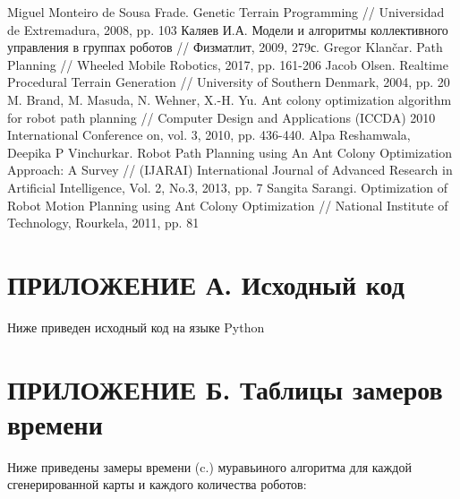 \documentclass{article}
\numberwithin{equation}{section}
\begin{document}
    \newpage
	\renewcommand\refname{ЛИТЕРАТУРА}
	\begin{thebibliography}{}
		 Miguel Monteiro de Sousa Frade. Genetic Terrain Programming // Universidad de Extremadura, 2008, pp. 103
		 Каляев И.А. Модели и алгоритмы коллективного управления в группах роботов // Физматлит, 2009, 279с.
		 Gregor Klančar. Path Planning // Wheeled Mobile Robotics, 2017, pp. 161-206
		 Jacob Olsen. Realtime Procedural Terrain Generation // University of Southern Denmark, 2004, pp. 20
		 M. Brand, M. Masuda, N. Wehner, X.-H. Yu. Ant colony optimization algorithm for robot path planning // Computer Design and Applications (ICCDA) 2010 International Conference on, vol. 3, 2010, pp. 436-440.
		 Alpa Reshamwala, Deepika P Vinchurkar. Robot Path Planning using An Ant Colony Optimization Approach: A Survey // (IJARAI) International Journal of Advanced Research in Artificial Intelligence, Vol. 2, No.3, 2013, pp. 7
		 Sangita Sarangi. Optimization of Robot Motion Planning using Ant Colony Optimization // National Institute of Technology, Rourkela, 2011, pp. 81
	\end{thebibliography}


    \newpage
	\section*{ПРИЛОЖЕНИЕ А. Исходный код} \label{sec:code}
	Ниже приведен исходный код на языке Python
	
	
	
	
	


    \newpage
	\section*{ПРИЛОЖЕНИЕ Б. Таблицы замеров времени} \label{sec:time}
	Ниже приведены замеры времени (c.) муравьиного алгоритма для каждой сгенерированной карты и каждого количества роботов:
\end{document}
